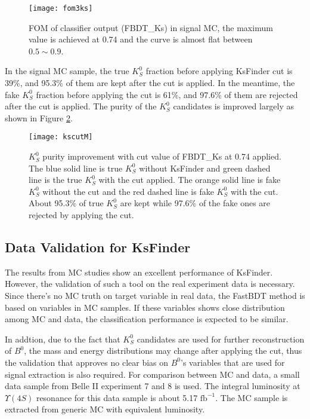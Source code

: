 \begin{figure}[H]
	\centering
	\texttt{[image: fom3ks]}
	\caption{FOM of classifier output (FBDT\_Ks) in signal MC, the maximum value is achieved at 0.74 and the curve is almost flat between $0.5\sim 0.9$.}
	\label{fig:ks_fom}
\end{figure}

In the signal MC sample, the true $K_S^0$ fraction before applying KsFinder cut is 39\%, and 95.3\% of them are kept after the cut is applied. In the meantime, the fake $K_S^0$ fraction before applying the cut is 61\%, and 97.6\% of them are rejected after the cut is applied. The purity of the $K_S^0$ candidates is improved largely as shown in Figure \ref{fig:ks_cutused}.

\begin{figure}[htpb]
	\centering
	\texttt{[image: kscutM]}
	\caption{$K_S^0$ purity improvement with cut value of FBDT\_Ks at 0.74 applied. The blue solid line is true $K_S^0$ without KsFinder and green dashed line is the true $K_S^0$ with the cut applied. The orange solid line is fake $K_S^0$ without the cut and the red dashed line is fake $K_S^0$ with the cut. About 95.3\% of true $K_S^0$ are kept while 97.6\% of the fake ones are rejected by applying the cut.}
	\label{fig:ks_cutused}
\end{figure}

\subsection{Data Validation for KsFinder}
The results from MC studies show an excellent performance of KsFinder. However, the validation of such a tool on the real experiment data is necessary. Since there's no MC truth on target variable in real data, the FastBDT method is based on variables in MC samples. If these variables shows close distribution among MC and data, the classification performance is expected to be similar.

In addtion, due to the fact that $K_S^0$ candidates are used for further reconstruction of $B^0$, the  mass and energy distributions may change after applying the cut, thus the validation that approves no clear bias on $B^0$'s variables that are used for signal extraction is also required. For comparison between MC and data, a small data sample from Belle II  experiment 7 and 8 is used. The integral luminosity at $\Upsilon(4S)$ resonance for this data sample is about 5.17 $\text{fb}^{-1}$. The MC sample is extracted from generic MC with equivalent luminosity.


